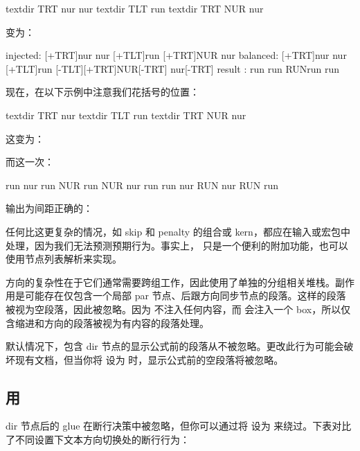 \begin{typing}
textdir TRT nur {nur textdir TLT run textdir TRT NUR} nur
\end{typing}

变为：

\begin{typing}
injected: [+TRT]nur {nur [+TLT]run [+TRT]NUR} nur
balanced: [+TRT]nur {nur [+TLT]run [-TLT][+TRT]NUR[-TRT]} nur[-TRT]
result  : run {run RUNrun } run
\end{typing}

现在，在以下示例中注意我们花括号的位置：

\begin{typing}
textdir TRT nur {{textdir TLT run} {textdir TRT NUR}} nur
\end{typing}

这变为：

\begin{typing}
[def]
\def\ltr{\linedir TLT\relax}
\def\rtl{\linedir TRT\relax}
\end{typing}



而这一次：

\begin{typing}
run {\rtl nur {\ltr run \rtl NUR \ltr run \rtl NUR} nur}
run {\ltr run {\rtl nur \ltr RUN \rtl nur \ltr RUN} run}
\end{typing}



输出为间距正确的：

任何比这更复杂的情况，如 skip 和 penalty 的组合或 kern，都应在输入或宏包中处理，因为我们无法预测预期行为。事实上， 只是一个便利的附加功能，也可以使用节点列表解析来实现。

方向的复杂性在于它们通常需要跨组工作，因此使用了单独的分组相关堆栈。副作用是可能存在仅包含一个局部 par 节点、后跟方向同步节点的段落。这样的段落被视为空段落，因此被忽略。因为 \type {\noindent} 不注入任何内容，而 \type {\indent} 会注入一个 box，所以仅含缩进和方向的段落被视为有内容的段落处理。

默认情况下，包含 dir 节点的显示公式前的段落从不被忽略。更改此行为可能会破坏现有文档，但当你将  设为  时，显示公式前的空段落将被忽略。

\subsection{用 }

dir 节点后的 glue 在断行决策中被忽略，但你可以通过将  设为  来绕过。下表对比了不同设置下文本方向切换处的断行行为：

